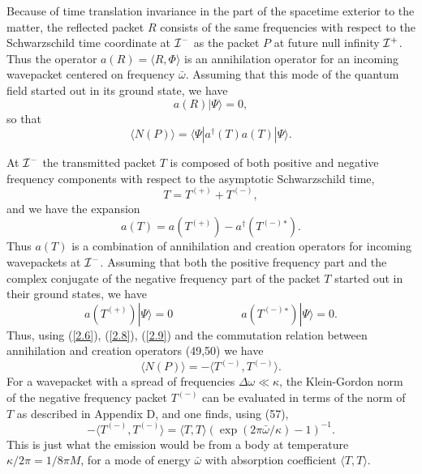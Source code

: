 \documentclass[12pt]{article}
\def\o{\omega}
\def\obar{\bar{\omega}}
\def\la{\langle}
\def\ra{\rangle}
\def\pastI{{\cal I}^-}
\def\futI{{\cal I}^+}
\begin{document}
Because of time translation invariance in the part of the
spacetime exterior to the matter, the reflected packet $R$
consists of the same frequencies with respect to
the Schwarzschild time
coordinate at $\pastI$ as the packet $P$ at future null
infinity $\futI$. Thus the operator
$a(R)=\langle R,\Phi\rangle$ is an annihilation operator
for an incoming wavepacket centered on frequency $\obar$.
Assuming that this mode of
the quantum field started out in its ground state, we have
\begin{equation} a(R)|\Psi\ra =0,
\end{equation}
so that
\begin{equation} \la N(P)\ra =\la\Psi|a^{\dagger}(T)a(T)|\Psi\ra.
\label{2.6}
\end{equation}

At $\pastI$ the transmitted packet $T$ is composed of both
positive and negative frequency components with respect to the
asymptotic Schwarzschild time,
\begin{equation}
T=T^{\scriptscriptstyle (+)}+T^{\scriptscriptstyle (-)},
\end{equation}
and we have the expansion
\begin{equation} a(T)=a(T^{\scriptscriptstyle (+)})-
a^{\dagger}(T^{\scriptscriptstyle (-)}{}^*).
\label{2.8}
\end{equation}
Thus $a(T)$ is a combination of annihilation and creation
operators for incoming wavepackets at $\pastI$.
Assuming that both the positive frequency part and the complex
conjugate of the negative frequency part of the packet $T$
started out in their ground states, we have
\begin{equation}
a(T^{\scriptscriptstyle (+)})|\Psi\ra=0\qquad\qquad\qquad
a(T^{\scriptscriptstyle (-)}{}^*)|\Psi\ra=0.
\label{2.9}
\end{equation}
Thus, using (\ref{2.6}), (\ref{2.8}), (\ref{2.9}) and the
commutation relation between
annihilation and creation operators (49,50) we have
\begin{equation} \la N(P)\ra =
-\la T^{\scriptscriptstyle (-)},T^{\scriptscriptstyle (-)}\ra.
\end{equation}
For a wavepacket with a spread of frequencies
$\Delta\o\ll\kappa$, the Klein-Gordon norm of the negative frequency
packet $T^{\scriptscriptstyle (-)}$ can be evaluated in terms of
the norm of $T$ as described in Appendix D, and one finds,
using (57),
\begin{equation}
-\la T^{\scriptscriptstyle (-)},T^{\scriptscriptstyle (-)}\ra
=\la T,T\ra (\exp(2\pi\obar/\kappa)-1)^{-1}.
\label{2.11}
\end{equation}
This is just what the emission would be from a body at
temperature $\kappa/2\pi=1/8\pi M$, for a mode of energy $\obar$
with absorption coefficient $\la T,T\ra$.
\end{document}
